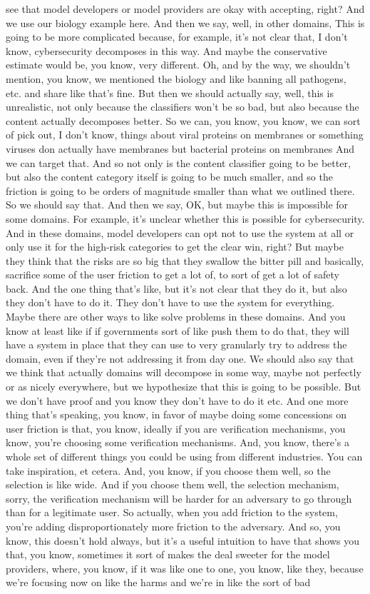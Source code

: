 \documentclass{article}
\theoremstyle{plain}
\theoremstyle{definition}
\theoremstyle{remark}
\begin{document}
see that model developers or model providers are okay with accepting, right? And we use our biology example here. And then we say, well, in other domains, This is going to be more complicated because, for example, it's not clear that, I don't know, cybersecurity decomposes in this way. And maybe the conservative estimate would be, you know, very different. Oh, and by the way, we shouldn't mention, you know, we mentioned the biology and like banning all pathogens, etc. and share like that's fine. But then we should actually say, well, this is unrealistic, not only because the classifiers won't be so bad, but also because the content actually decomposes better. So we can, you know, you know, we can sort of pick out, I don't know, things about viral proteins on membranes or something viruses don actually have membranes but bacterial proteins on membranes And we can target that. And so not only is the content classifier going to be better, but also the content category itself is going to be much smaller, and so the friction is going to be orders of magnitude smaller than what we outlined there. So we should say that. And then we say, OK, but maybe this is impossible for some domains. For example, it's unclear whether this is possible for cybersecurity. And in these domains, model developers can opt not to use the system at all or only use it for the high-risk categories to get the clear win, right? But maybe they think that the risks are so big that they swallow the bitter pill and basically, sacrifice some of the user friction to get a lot of, to sort of get a lot of safety back. And the one thing that's like, but it's not clear that they do it, but also they don't have to do it. They don't have to use the system for everything. Maybe there are other ways to like solve problems in these domains. And you know at least like if if governments sort of like push them to do that, they will have a system in place that they can use to very granularly try to address the domain, even if they're not addressing it from day one. We should also say that we think that actually domains will decompose in some way, maybe not perfectly or as nicely everywhere, but we hypothesize that this is going to be possible. But we don't have proof and you know they don't have to do it etc. And one more thing that's speaking, you know, in favor of maybe doing some concessions on user friction is that, you know, ideally if you are verification mechanisms, you know, you're choosing some verification mechanisms. And, you know, there's a whole set of different things you could be using from different industries. You can take inspiration, et cetera. And, you know, if you choose them well, so the selection is like wide. And if you choose them well, the selection mechanism, sorry, the verification mechanism will be harder for an adversary to go through than for a legitimate user. So actually, when you add friction to the system, you're adding disproportionately more friction to the adversary. And so, you know, this doesn't hold always, but it's a useful intuition to have that shows you that, you know, sometimes it sort of makes the deal sweeter for the model providers, where, you know, if it was like one to one, you know, like they, because we're focusing now on like the harms and we're in like the sort of bad 
\end{document}
